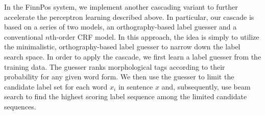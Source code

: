 \documentclass[smallextended]{svjour3}       %
\begin{document}

In the FinnPos system, we implement another cascading variant to further accelerate the perceptron learning described above. In particular, our cascade is based on a series of two models, an orthography-based label guesser and a conventional $n$th-order CRF model. In this approach, the idea is simply to utilize the minimalistic, orthography-based label guesser to narrow down the label search space. In order to apply the cascade, we first learn a label guesser from the training data. The guesser ranks morphological tags according to their probability for any given word form. We then use the guesser to limit the candidate label set for each word $x_i$ in sentence $x$ and, subsequently, use beam search to find the highest scoring label sequence among the limited candidate sequences.
\end{document}
